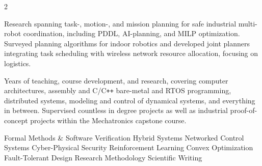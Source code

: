 


\makecvheader


\begin{paracol}{2}



Research spanning task-, motion-, and mission planning for safe industrial multi-robot coordination, including PDDL, AI-planning, and MILP optimization. Surveyed planning algorithms for indoor robotics and developed joint planners integrating task scheduling with wireless network resource allocation, focusing on logistics.

\divider

Years of teaching, course development, and research, covering computer architectures, assembly and C/C\texttt{++} bare-metal and RTOS programming, distributed systems, modeling and control of dynamical systems, and everything in between.
Supervised countless in degree projects as well as industrial proof-of-concept projects within the Mechatronics capstone course.

\hfill



Formal Methods \& Software Verification \textbullet{}
Hybrid Systems \textbullet{}
Networked Control Systems \textbullet{}
Cyber-Physical Security \textbullet{}
Reinforcement Learning \textbullet{}
Convex Optimization \textbullet{}
Fault-Tolerant Design \textbullet{}
Research Methodology \textbullet{}
Scientific Writing


\end{paracol}
